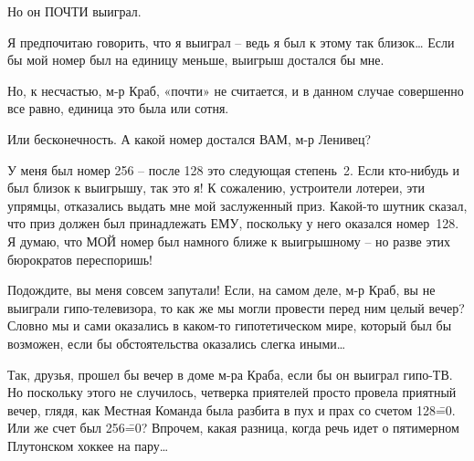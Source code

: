 \documentclass[../main.tex]{subfiles}
\begin{document}
\begin{dialogue}
 Но он ПОЧТИ выиграл.

 Я предпочитаю говорить, что я выиграл \--- ведь я был к этому так близок\ldots{} Если бы мой номер был на единицу меньше, выигрыш достался бы мне.

 Но, к несчастью, м-р Краб, «почти» не считается, и в данном случае совершенно все равно, единица это была или сотня.

 Или бесконечность. А какой номер достался ВАМ, м-р Ленивец?

 У меня был номер 256 \--- после 128 это следующая степень~2. Если кто-нибудь и был близок к выигрышу, так это я! К сожалению, устроители лотереи, эти упрямцы, отказались выдать мне мой заслуженный приз. Какой-то шутник сказал, что приз должен был принадлежать ЕМУ, поскольку у него оказался номер~128. Я думаю, что МОЙ номер был намного ближе к выигрышному \--- но разве этих бюрократов переспоришь!

 Подождите, вы меня совсем запутали! Если, на самом деле, м-р Краб, вы не выиграли гипо-телевизора, то как же мы могли провести перед ним целый вечер? Словно мы и сами оказались в каком-то гипотетическом мире, который был бы возможен, если бы обстоятельства оказались слегка иными\ldots{}

 Так, друзья, прошел бы вечер в доме м-ра Краба, если бы он выиграл гипо-ТВ. Но поскольку этого не случилось, четверка приятелей просто провела приятный вечер, глядя, как Местная Команда была разбита в пух и прах со счетом 128\==0. Или же счет был 256\==0? Впрочем, какая разница, когда речь идет о пятимерном Плутонском хоккее на пару\ldots{}

\end{dialogue}
\end{document}
